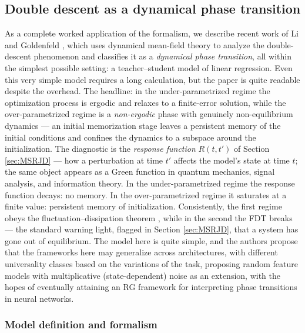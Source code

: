 \documentclass[11pt]{article}
\begin{document}
\subsection{Double descent as a dynamical phase transition}
\label{sec:double-descent}

As a complete worked application of the formalism, we describe recent work of Li and Goldenfeld \cite{liBrokenErgodicityViolation2026}, which uses dynamical mean-field theory to analyze the double-descent phenomenon and classifies it as a \emph{dynamical phase transition}, all within the simplest possible setting: a teacher--student model of linear regression. Even this very simple model requires a long calculation, but the paper is quite readable despite the overhead. The headline: in the under-parametrized regime the optimization process is ergodic and relaxes to a finite-error solution, while the over-parametrized regime is a \emph{non-ergodic} phase with genuinely non-equilibrium dynamics --- an initial memorization stage leaves a persistent memory of the initial conditions and confines the dynamics to a subspace around the initialization.  The diagnostic is the \textit{response function} $R(t,t')$ of Section \ref{sec:MSRJD} --- how a perturbation at time $t'$ affects the model's state at time $t$; the same object appears as a Green function in quantum mechanics, signal analysis, and information theory. In the under-parametrized regime the response function decays: no memory. In the over-parametrized regime it saturates at a finite value: persistent memory of initialization. Consistently, the first regime obeys the fluctuation--dissipation theorem \cite{kuboStatisticalMechanicalTheoryIrreversible1957,kuboFluctuationdissipationTheorem1966,goldenfeldLecturesPhaseTransitions2018a}, while in the second the FDT breaks --- the standard warning light, flagged in Section \ref{sec:MSRJD}, that a system has gone out of equilibrium.  The model here is quite simple, and the authors propose that the frameworks here may generalize across architectures, with different universality classes based on the variations of the task, proposing random feature models with multiplicative (state-dependent) noise as an extension, with the hopes of eventually attaining an RG framework for interpreting phase transitions in neural networks.  
\subsubsection{Model definition and formalism}
\end{document}
